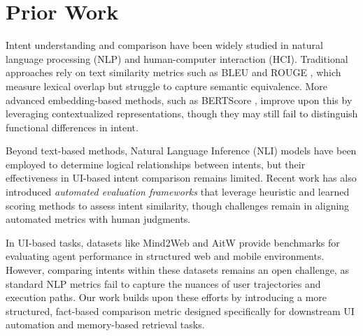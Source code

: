 
\section{Prior Work}

Intent understanding and comparison have been widely studied in natural language processing (NLP) and human-computer interaction (HCI). Traditional approaches rely on text similarity metrics such as BLEU \cite{papineni2002bleu} and ROUGE \cite{lin2004rouge}, which measure lexical overlap but struggle to capture semantic equivalence. More advanced embedding-based methods, such as BERTScore \cite{zhang2019bertscore}, improve upon this by leveraging contextualized representations, though they may still fail to distinguish functional differences in intent.

Beyond text-based methods, Natural Language Inference (NLI) models \cite{bowman2015large} have been employed to determine logical relationships between intents, but their effectiveness in UI-based intent comparison remains limited. Recent work has also introduced \textit{automated evaluation frameworks} \cite{berkovitch2024identifying} that leverage heuristic and learned scoring methods to assess intent similarity, though challenges remain in aligning automated metrics with human judgments.

In UI-based tasks, datasets like Mind2Web \cite{mind2web2024} and AitW \cite{aitw2024} provide benchmarks for evaluating agent performance in structured web and mobile environments. However, comparing intents within these datasets remains an open challenge, as standard NLP metrics fail to capture the nuances of user trajectories and execution paths. Our work builds upon these efforts by introducing a more structured, fact-based comparison metric designed specifically for downstream UI automation and memory-based retrieval tasks.
